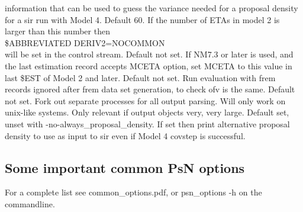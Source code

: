 \begin{optionlist}
information that can be used to guess the variance needed for
a proposal density for a sir run with Model 4.
\nextopt
{}
Default 60.
If the number of ETAs in model 2 is larger than this number then \\
\$ABBREVIATED DERIV2=NOCOMMON\\
will be set in the control stream.
\nextopt
{}
Default not set.
If NM7.3 or later is used, and the last estimation record accepts MCETA option, set MCETA to this value
in last \$EST of Model 2 and later.
\nextopt
{}
Default not set. Run evaluation with frem records ignored after frem data set generation, to check ofv is the same.
\nextopt
{}
Default not set. Fork out separate processes for all output parsing. Will only work on unix-like systems.
Only relevant if output objects very, very large.
\nextopt
{}
Default set, unset with -no-always\_proposal\_density. If set then print alternative
proposal density to use as input to sir even if Model 4 covstep is successful.
\nextopt

\end{optionlist}
\subsection{Some important common PsN options}
For a complete list see common\_options.pdf,
or psn\_options -h on the commandline.



